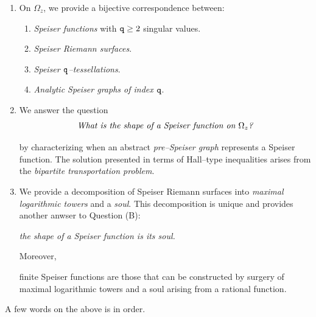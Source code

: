\documentclass[final,3p,times]{elsarticle}
\theoremstyle{definition}
\begin{document}
\begin{enumerate}[label=\Alph*),leftmargin=*]

\item
On $\Omega_z$,
we provide a bijective correspondence between:

\begin{enumerate}[label=\arabic*),leftmargin=*]
\item
\emph{Speiser functions}
with ${\tt q} \geq 2$ singular values.

\item 
\emph{Speiser Riemann surfaces}.

\item
\emph{Speiser $\tt q$--tessellations}.

\item
\emph{Analytic Speiser graphs of index $\tt q$}.

\end{enumerate}

\smallskip

\item
We answer the question
\begin{equation*}
\text{\emph{What is the shape of a Speiser function
on $\Omega_z$?}}
\end{equation*}

\noindent
by characterizing when 
an abstract \emph{pre--Speiser graph} represents 
a Speiser function. 
The solution presented in terms of Hall--type inequalities 
arises from the \emph{bipartite transportation problem}.

\item
We provide a 
decomposition of Speiser Riemann surfaces 
into \emph{maximal logarithmic towers} and a \emph{soul}.
This decomposition is unique 
and provides another anwser to Question (B): 

\centerline{
\emph{the shape of a Speiser function is its soul.}
}
 
\noindent 
Moreover, 

{\it 
\begin{center}
finite Speiser functions 
are those that can be constructed by surgery of
\\
maximal logarithmic towers and
a soul arising from a rational function. 
\end{center}
}


\end{enumerate}

\noindent
A few words on the above is in order.
\end{document}
